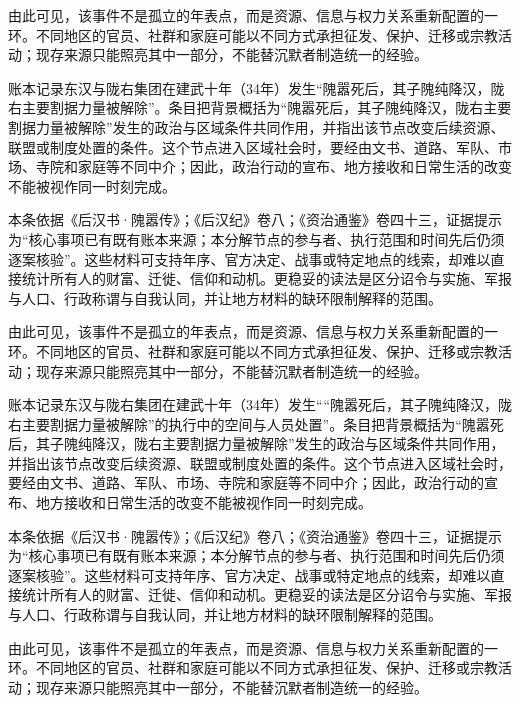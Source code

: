 由此可见，该事件不是孤立的年表点，而是资源、信息与权力关系重新配置的一环。不同地区的官员、社群和家庭可能以不同方式承担征发、保护、迁移或宗教活动；现存来源只能照亮其中一部分，不能替沉默者制造统一的经验。

账本记录东汉与陇右集团在建武十年（34年）发生“隗嚣死后，其子隗纯降汉，陇右主要割据力量被解除”。条目把背景概括为“隗嚣死后，其子隗纯降汉，陇右主要割据力量被解除”发生的政治与区域条件共同作用，并指出该节点改变后续资源、联盟或制度处置的条件。这个节点进入区域社会时，要经由文书、道路、军队、市场、寺院和家庭等不同中介；因此，政治行动的宣布、地方接收和日常生活的改变不能被视作同一时刻完成。

本条依据《后汉书·隗嚣传》；《后汉纪》卷八；《资治通鉴》卷四十三，证据提示为“核心事项已有既有账本来源；本分解节点的参与者、执行范围和时间先后仍须逐案核验”。这些材料可支持年序、官方决定、战事或特定地点的线索，却难以直接统计所有人的财富、迁徙、信仰和动机。更稳妥的读法是区分诏令与实施、军报与人口、行政称谓与自我认同，并让地方材料的缺环限制解释的范围。

由此可见，该事件不是孤立的年表点，而是资源、信息与权力关系重新配置的一环。不同地区的官员、社群和家庭可能以不同方式承担征发、保护、迁移或宗教活动；现存来源只能照亮其中一部分，不能替沉默者制造统一的经验。

账本记录东汉与陇右集团在建武十年（34年）发生““隗嚣死后，其子隗纯降汉，陇右主要割据力量被解除”的执行中的空间与人员处置”。条目把背景概括为“隗嚣死后，其子隗纯降汉，陇右主要割据力量被解除”发生的政治与区域条件共同作用，并指出该节点改变后续资源、联盟或制度处置的条件。这个节点进入区域社会时，要经由文书、道路、军队、市场、寺院和家庭等不同中介；因此，政治行动的宣布、地方接收和日常生活的改变不能被视作同一时刻完成。

本条依据《后汉书·隗嚣传》；《后汉纪》卷八；《资治通鉴》卷四十三，证据提示为“核心事项已有既有账本来源；本分解节点的参与者、执行范围和时间先后仍须逐案核验”。这些材料可支持年序、官方决定、战事或特定地点的线索，却难以直接统计所有人的财富、迁徙、信仰和动机。更稳妥的读法是区分诏令与实施、军报与人口、行政称谓与自我认同，并让地方材料的缺环限制解释的范围。

由此可见，该事件不是孤立的年表点，而是资源、信息与权力关系重新配置的一环。不同地区的官员、社群和家庭可能以不同方式承担征发、保护、迁移或宗教活动；现存来源只能照亮其中一部分，不能替沉默者制造统一的经验。

